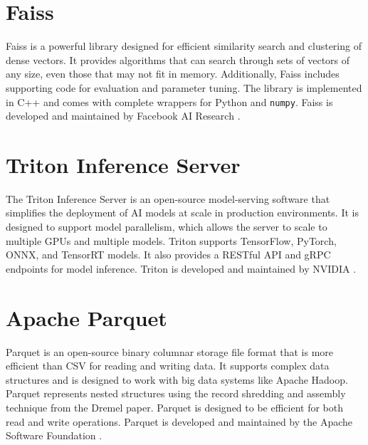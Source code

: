 \section{Faiss}
Faiss is a powerful library designed for efficient similarity search and clustering of dense vectors. It provides algorithms that can search through sets of vectors of any size, even those that may not fit in memory. Additionally, Faiss includes supporting code for evaluation and parameter tuning. The library is implemented in C++ and comes with complete wrappers for Python and \texttt{numpy}. Faiss is developed and maintained by Facebook AI Research \cite{Faiss}.

\section{Triton Inference Server}
The Triton Inference Server is an open-source model-serving software that simplifies the deployment of AI models at scale in production environments. It is designed to support model parallelism, which allows the server to scale to multiple GPUs and multiple models. Triton supports TensorFlow, PyTorch, ONNX, and TensorRT models. It also provides a RESTful API and gRPC endpoints for model inference. Triton is developed and maintained by NVIDIA \cite{TritonInferenceServer}.

\section{Apache Parquet}
Parquet is an open-source binary columnar storage file format that is more efficient than CSV for reading and writing data. It supports complex data structures and is designed to work with big data systems like Apache Hadoop.
Parquet represents nested structures using the record shredding and assembly technique from the Dremel \cite{Dremel} paper.
Parquet is designed to be efficient for both read and write operations. 
Parquet is developed and maintained by the Apache Software Foundation \cite{ApacheParquet}. 